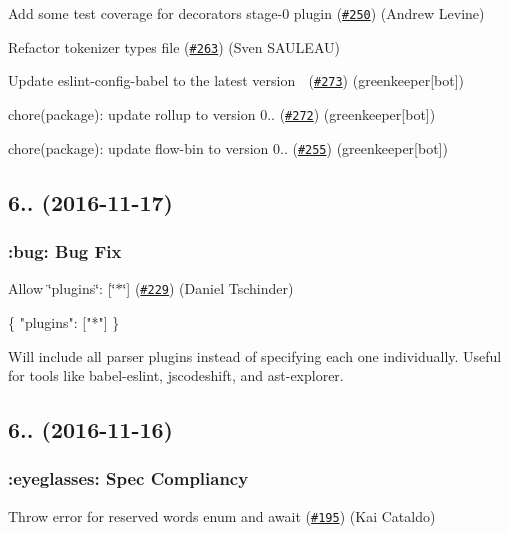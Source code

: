 Add some test coverage for decorators stage-\/0 plugin (\href{https://github.com/babel/babylon/pull/250}{\tt \#250}) (Andrew Levine)

Refactor tokenizer types file (\href{https://github.com/babel/babylon/pull/263}{\tt \#263}) (Sven S\+A\+U\+L\+E\+AU)

Update eslint-\/config-\/babel to the latest version 🚀 (\href{https://github.com/babel/babylon/pull/273}{\tt \#273}) (greenkeeper\mbox{[}bot\mbox{]})

chore(package)\+: update rollup to version 0.. (\href{https://github.com/babel/babylon/pull/272}{\tt \#272}) (greenkeeper\mbox{[}bot\mbox{]})

chore(package)\+: update flow-\/bin to version 0.. (\href{https://github.com/babel/babylon/pull/255}{\tt \#255}) (greenkeeper\mbox{[}bot\mbox{]})

\subsection*{6.. (2016-\/11-\/17)}

\subsubsection*{\+:bug\+: Bug Fix}

Allow {\ttfamily \char`\"{}plugins\char`\"{}\+: \mbox{[}\char`\"{}$\ast$\char`\"{}\mbox{]}} (\href{https://github.com/babel/babylon/pull/229}{\tt \#229}) (Daniel Tschinder)


\begin{DoxyCode}
\{
  "plugins": ["*"]
\}
\end{DoxyCode}


Will include all parser plugins instead of specifying each one individually. Useful for tools like babel-\/eslint, jscodeshift, and ast-\/explorer.

\subsection*{6.. (2016-\/11-\/16)}

\subsubsection*{\+:eyeglasses\+: Spec Compliancy}

Throw error for reserved words {\ttfamily enum} and {\ttfamily await} (\href{https://github.com/babel/babylon/pull/195}{\tt \#195}) (Kai Cataldo)

